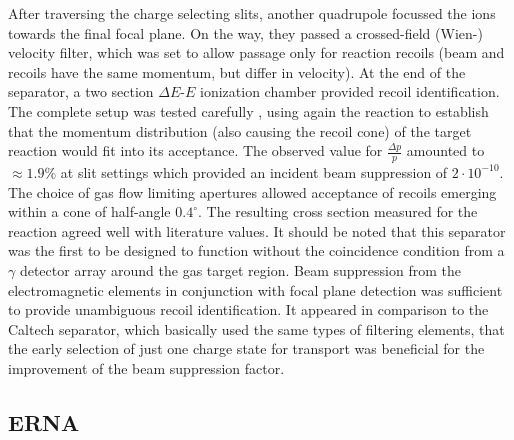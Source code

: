 After traversing the charge selecting slits, another quadrupole focussed the ions towards the final focal plane. On the way, they passed a crossed-field (Wien-) velocity filter, which was set to allow passage only for reaction recoils (beam and recoils have the same momentum, but differ in velocity). At the end of the separator, a two section $\Delta{}E$-$E$ ionization chamber provided recoil identification. The complete setup was tested carefully \cite{gial96}, using again the  reaction to establish that the momentum distribution (also causing the recoil cone) of the  target reaction would fit into its acceptance. The observed value for $\frac{\Delta{}p}{p}$ amounted to $\approx1.9\%$ at slit settings which provided an incident  beam suppression of $2\cdot10^{-10}$. The choice of gas flow limiting apertures allowed acceptance of recoils emerging within a cone of half-angle $0.4^\circ$. The resulting cross section measured for the  reaction agreed well with literature values. It should be noted that this separator was the first to be designed to function without the coincidence condition from a $\gamma$ detector array around the gas target region. Beam suppression from the electromagnetic elements in conjunction with focal plane detection was sufficient to provide unambiguous  recoil identification. It appeared in comparison to the Caltech separator, which basically used the same types of filtering elements, that the early selection of just one charge state for transport was beneficial for the improvement of the beam suppression factor. 

\subsection{ERNA}

